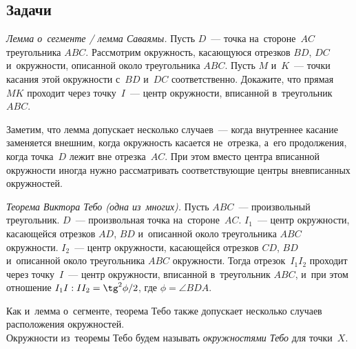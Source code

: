 \subsection*{Задачи}

\begin{problems}

\item\emph{Лемма о~сегменте / лемма Саваямы.}
Пусть $D$~--- точка на~стороне~$AC$ треугольника $ABC$.
Рассмотрим окружность, касающуюся отрезков $BD$, $DC$ и~окружности, описанной
около треугольника $ABC$.
Пусть $M$ и~$K$~--- точки касания этой окружности с~$BD$ и~$DC$ соответственно.
Докажите, что прямая~$MK$ проходит через точку~$I$~--- центр окружности,
вписанной в~треугольник $ABC$.

\end{problems}

Заметим, что лемма допускает несколько случаев~--- когда внутреннее касание
заменяется внешним, когда окружность касается не~отрезка, а~его продолжения,
когда точка~$D$ лежит вне отрезка~$AC$.
При этом вместо центра вписанной окружности иногда нужно рассматривать
соответствующие центры вневписанных окружностей.

\begin{problems}

\item \emph{Теорема Виктора Тебо (одна из~многих).}
Пусть $ABC$~--- произвольный треугольник.
$D$~--- произвольная точка на~стороне~$AC$.
$I_{1}$~--- центр окружности, касающейся отрезков $AD$, $BD$ и~описанной около
треугольника $ABC$ окружности.
$I_{2}$~--- центр окружности, касающейся отрезков $CD$, $BD$ и~описанной около
треугольника $ABC$ окружности.
Тогда отрезок~$I_{1}I_{2}$ проходит через точку~$I$~--- центр окружности,
вписанной в~треугольник $ABC$, и~при этом отношение
$I_{1}I : II_{2} = \tg^2{\phi/2}$, где $\phi = \angle BDA$.

\end{problems}

Как и~лемма о~сегменте, теорема Тебо также допускает несколько случаев
расположения окружностей.
\\
Окружности из~теоремы Тебо будем называть
\emph{окружностями Тебо} для точки~$X$.

